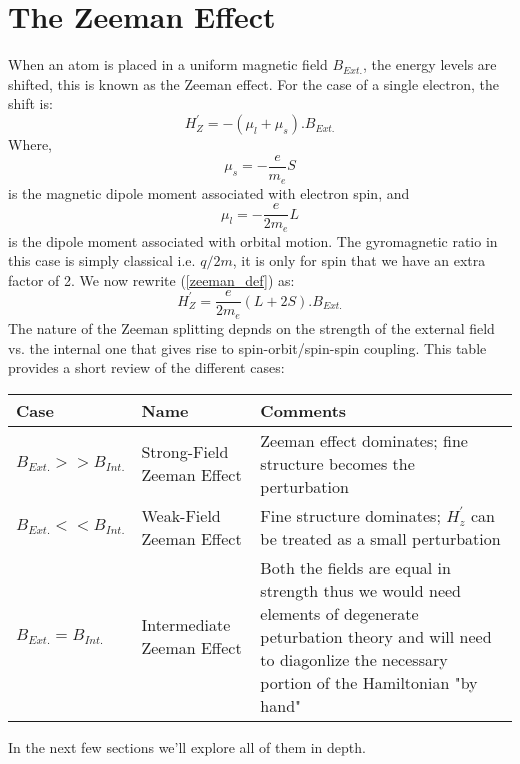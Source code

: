 \section{The Zeeman Effect}
When an atom is placed in a uniform magnetic field $B_{Ext.}$, the energy levels are shifted, this is known as the Zeeman effect. For the case of a single electron, the shift is:
\begin{equation}\label{zeeman_def}
H^{'}_{Z} = -(\mu_{l} + \mu_{s}).B_{Ext.}
\end{equation}
Where,
\begin{equation}
\mu_{s} = -\frac{e}{m_{e}}S
\end{equation}
is the magnetic dipole moment associated with electron spin, and
\begin{equation}
\mu_{l} = -\frac{e}{2m_{e}}L
\end{equation}
is the dipole moment associated with orbital motion. The gyromagnetic ratio in this case is simply classical i.e. $q/2m$, it is only for spin that we have an extra factor of 2. We now rewrite (\ref{zeeman_def}) as:
\begin{equation}
H^{'}_{Z} = \frac{e}{2m_{e}}(L + 2S).B_{Ext.}
\end{equation}
The nature of the Zeeman splitting depnds on the strength of the external field vs. the internal one that gives rise to spin-orbit/spin-spin coupling. This table provides a short review of the different cases:
\begin{center}
	\begin{tabularx}{0.9\textwidth} { 
			| >{\centering\arraybackslash}X 
			| >{\centering\arraybackslash}X 
			| >{\centering\arraybackslash}X | }
		\hline
		\textbf{Case} & \textbf{Name} & \textbf{Comments} \\
		\hline
		$B_{Ext.} >> B_{Int.}$  & Strong-Field Zeeman Effect  & Zeeman effect dominates; fine structure becomes the perturbation  \\
		\hline
		$B_{Ext.} << B_{Int.}$  & Weak-Field Zeeman Effect  & Fine structure dominates; $H^{'}_{z}$ can be treated as a small perturbation   \\
		\hline
		$B_{Ext.} = B_{Int.}$  & Intermediate Zeeman Effect  & Both the fields are equal in strength thus we would need elements of degenerate peturbation theory and will need to diagonlize the necessary portion of the Hamiltonian "by hand" \\
		\hline
	\end{tabularx}
\end{center}
In the next few sections we'll explore all of them in depth.
